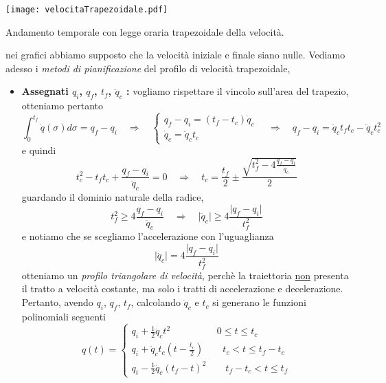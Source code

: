 \begin{center}
	\texttt{[image: velocitaTrapezoidale.pdf]}
	\caption{Andamento temporale con legge oraria trapezoidale della velocità.}
\end{center}
nei grafici abbiamo supposto che la velocità iniziale e finale siano nulle. Vediamo adesso i \emph{metodi di pianificazione} del profilo di velocità trapezoidale,
\begin{itemize}
	\item \textbf{Assegnati $q_i$, $q_f$, $t_f$, $\ddot{q}_c$ :} vogliamo rispettare il vincolo sull'area del trapezio, otteniamo pertanto
		\begin{equation*}
			\int_0^{t_f} \dot{q}(\sigma) d\sigma = q_f - q_i \quad \Rightarrow \quad 
			\begin{cases}
				q_f - q_i = (t_f - t_c) \dot{q}_c \\
				\dot{q}_c = \ddot{q}_c t_c 
			\end{cases}
			\quad \Rightarrow \quad q_f - q_i = \ddot{q}_c t_f t_c - \ddot{q}_c t_c^2
		\end{equation*}
		e quindi 
		\begin{equation*}
			t_c^2 - t_f t_c +  \frac{q_f - q_i}{\ddot{q}_c} = 0 \quad \Rightarrow \quad t_c = \frac{t_f}{2} \pm \frac{\sqrt{t_f^2 - 4 \frac{q_f - q_i}{\ddot{q}_c}}}{2}
		\end{equation*}
		guardando il dominio naturale della radice,
		\begin{equation*}
			t_f^2 \geqslant 4 \frac{q_f - q_i}{\ddot{q}_c} \quad \Rightarrow \quad \vert \ddot{q}_c \vert \geqslant 4 \frac{\vert q_f - q_i \vert}{t_f^2}
		\end{equation*}
		e notiamo che se scegliamo l'accelerazione con l'uguaglianza
		\begin{equation}
			\vert \ddot{q}_c \vert = 4 \frac{\vert q_f - q_i \vert}{t_f^2}
		\end{equation}
		otteniamo un \emph{profilo triangolare di velocità}, perchè la traiettoria \underline{non} presenta il tratto a velocità costante, ma solo i tratti di accelerazione e decelerazione. Pertanto, avendo $q_i$, $q_f$, $t_f$, calcolando $\ddot{q}_c$ e $t_c$ si generano le funzioni polinomiali seguenti
		\begin{equation}
			q(t) = 
			\begin{cases}
				q_i + \frac{1}{2} \ddot{q}_c t^2 \qquad \qquad \;\;\; 0 \leqslant t \leqslant t_c \\
				q_i + \ddot{q}_c t_c (t- \frac{t_c}{2}) \qquad t_c < t \leqslant t_f - t_c \\
				q_i - \frac{1}{2} \ddot{q}_c (t_f - t)^2 \qquad t_f - t_c < t \leqslant t_f
			\end{cases}
		\end{equation}			
	

\end{itemize}
